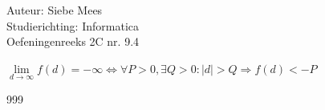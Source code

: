 \documentclass[a4paper]{article}
\begin{document}
  
\noindent \large Auteur: Siebe Mees \\
\noindent \large Studierichting: Informatica\\
\noindent \large Oefeningenreeks 2C nr. 9.4\\

\medskip

\normalsize

$\lim\limits_{d\rightarrow \infty} f(d) = -\infty \Leftrightarrow \forall P > 0, \exists Q > 0 : |d| > Q \Rightarrow f(d) < -P$\\

\begin{thebibliography}{999}
\end{thebibliography}
\end{document}
